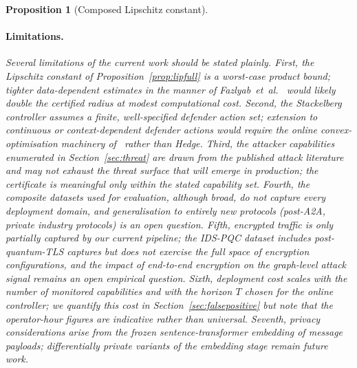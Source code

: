 \documentclass{ieeeaccess}
\newtheorem{proposition}[theorem]{Proposition}
\begin{document}
\begin{proposition}[Composed Lipschitz constant]
\paragraph{Limitations.} Several limitations of the current work should be stated plainly. First, the Lipschitz constant of Proposition~\ref{prop:lipfull} is a worst-case product bound; tighter data-dependent estimates in the manner of Fazlyab~\textit{et~al.}~\cite{Fazlyab2019LipSDP} would likely double the certified radius at modest computational cost. Second, the Stackelberg controller assumes a finite, well-specified defender action set; extension to continuous or context-dependent defender actions would require the online convex-optimisation machinery of~\cite{Hazan2016OCO} rather than Hedge. Third, the attacker capabilities enumerated in Section~\ref{sec:threat} are drawn from the published attack literature and may not exhaust the threat surface that will emerge in production; the certificate is meaningful only within the stated capability set. Fourth, the composite datasets used for evaluation, although broad, do not capture every deployment domain, and generalisation to entirely new protocols (post-A2A, private industry protocols) is an open question. Fifth, encrypted traffic is only partially captured by our current pipeline; the IDS-PQC dataset includes post-quantum-TLS captures but does not exercise the full space of encryption configurations, and the impact of end-to-end encryption on the graph-level attack signal remains an open empirical question. Sixth, deployment cost scales with the number of monitored capabilities and with the horizon $T$ chosen for the online controller; we quantify this cost in Section~\ref{sec:falsepositive} but note that the operator-hour figures are indicative rather than universal. Seventh, privacy considerations arise from the frozen sentence-transformer embedding of message payloads; differentially private variants of the embedding stage remain future work.


\end{proposition}
\end{document}
